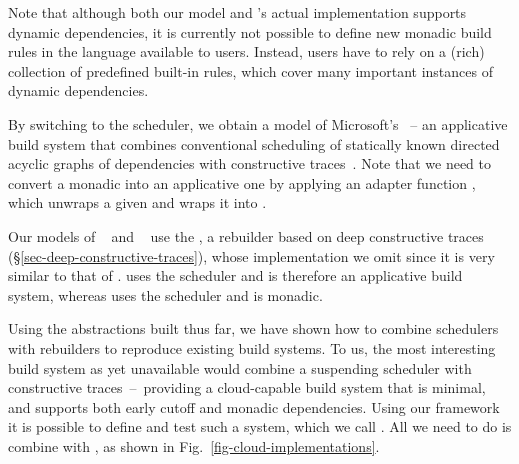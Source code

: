 Note that although both our model and \Bazel's actual implementation supports
dynamic dependencies, it is currently not possible to define new monadic build
rules in the language available to users. Instead, users have to rely on a
(rich) collection of predefined built-in rules, which cover many
important instances of dynamic dependencies.

By switching to the  scheduler, we obtain a model of
Microsoft's \CloudBuild~-- an applicative build system that combines
conventional scheduling of statically known directed acyclic graphs of
dependencies with constructive traces~\cite{esfahani2016cloudbuild}. Note that
we need to convert a monadic  into an applicative one by
applying an adapter function , which unwraps a given
 and wraps it into .

Our models of \Buck~\cite{buck} and \Nix~\cite{dolstra2004nix} use the
, a rebuilder based on deep constructive traces
(\S\ref{sec-deep-constructive-traces}), whose implementation we omit since it
is very similar to that of . \Buck uses the 
scheduler and is therefore an applicative build system, whereas \Nix uses the
 scheduler and is monadic.

Using the abstractions built thus far, we have shown how to combine schedulers
with rebuilders to reproduce existing build systems. To us, the most interesting
build system as yet unavailable would combine a suspending scheduler with
constructive traces~--~providing a cloud-capable build system that is minimal,
and supports both early cutoff and monadic dependencies. Using our framework it
is possible to define and test such a system, which we call \Cloud \Shake. All
we need to do is combine  with ,
as shown in Fig.~\ref{fig-cloud-implementations}.
